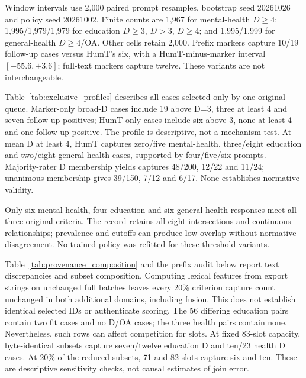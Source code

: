 Window intervals use 2,000 paired prompt resamples, bootstrap seed 20261026 and policy seed 20261002. Finite counts are 1,967 for mental-health $D\geq4$; 1,995/1,979/1,979 for education $D\geq3$, $D>3$, $D\geq4$; and 1,995/1,999 for general-health $D\geq4$/OA. Other cells retain 2,000. Prefix markers capture 10/19 follow-up cases versus HumT's six, with a HumT-minus-marker interval $[-55.6,+3.6]$; full-text markers capture twelve. These variants are not interchangeable.

Table~\ref{tab:exclusive_profiles} describes all cases selected only by one original queue. Marker-only broad-D cases include 19 above D=3, three at least 4 and seven follow-up positives; HumT-only cases include six above 3, none at least 4 and one follow-up positive. The profile is descriptive, not a mechanism test. At mean D at least 4, HumT captures zero/five mental-health, three/eight education and two/eight general-health cases, supported by four/five/six prompts. Majority-rater D membership yields captures 48/200, 12/22 and 11/24; unanimous membership gives 39/150, 7/12 and 6/17. None establishes normative validity.


Only six mental-health, four education and six general-health responses meet all three original criteria. The record retains all eight intersections and continuous relationships; prevalence and cutoffs can produce low overlap without normative disagreement. No trained policy was refitted for these threshold variants.

Table~\ref{tab:provenance_composition} and the prefix audit below report text discrepancies and subset composition. Computing lexical features from export strings on unchanged full batches leaves every 20\% criterion capture count unchanged in both additional domains, including fusion. This does not establish identical selected IDs or authenticate scoring. The 56 differing education pairs contain two fit cases and no D/OA cases; the three health pairs contain none. Nevertheless, such rows can affect competition for slots. At fixed 83-slot capacity, byte-identical subsets capture seven/twelve education D and ten/23 health D cases. At 20\% of the reduced subsets, 71 and 82 slots capture six and ten. These are descriptive sensitivity checks, not causal estimates of join error.



\clearpage
